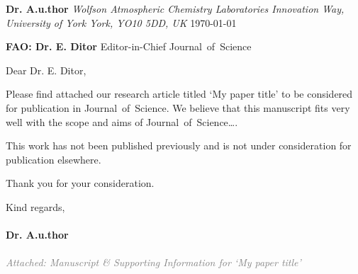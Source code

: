 \documentclass{article}
\newcommand{\addresseeName}{Dr. E. Ditor}
\newcommand{\addresseeTitle}{Editor-in-Chief}
\newcommand{\journal}{Journal~of~Science}
\newcommand{\letterWriter}{Dr. A.u.thor}
\newcommand{\paperTitle}{My paper title}
\newcommand{\attached}{Manuscript \& Supporting Information for `\paperTitle'}
\newcommand{\MakeLteHead}{
    \begin{flushright}
        \textbf{\letterWriter}\newline
        \emph{Wolfson Atmospheric Chemistry Laboratories\newline 
        Innovation Way, University of York\newline
        York, YO10 5DD, UK}\newline
        \bigskip
        \today
    \end{flushright}
    
    \begin{flushleft}
        \textbf{FAO: \addresseeName}\newline
        \addresseeTitle\newline
        \journal
    \end{flushleft}
    
    \bigskip
    \bigskip
    Dear \addresseeName,\newline

}
\newcommand{\MakeLteTail}{
    \bigskip\RaggedRight
    \noindent Kind regards,\\~\\
    \noindent\textbf{\letterWriter}\\~\\
    \small
    \noindent\textit{\textcolor{gray}{Attached: \attached}}
    \normalsize
}
\begin{document}
\MakeLteHead

\justify Please find attached our research article titled `\paperTitle' to be considered for publication in \journal. We believe that this manuscript fits very well with the scope and aims of \journal\dots.

\bigskip\noindent \lipsum[1]

\bigskip\noindent \lipsum[2]

\bigskip\noindent \lipsum[3]

\bigskip\noindent This work has not been published previously and is not under consideration for publication elsewhere.

\bigskip\noindent Thank you for your consideration.

\MakeLteTail

\newpage
\end{document}
